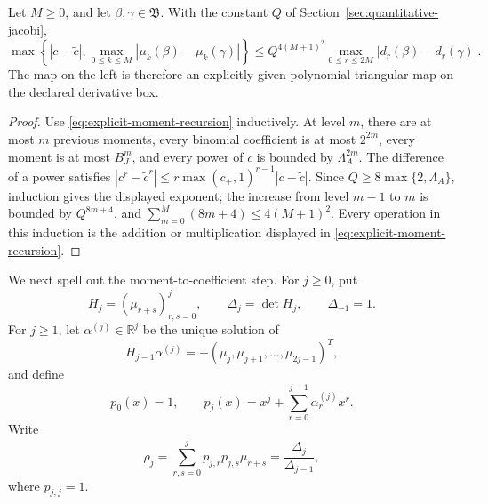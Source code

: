 \begin{proposition}
\label{prop:quantified-moment-map}
Let \(M\ge0\), and let \(\beta,\gamma\in\mathfrak B\).  With the constant
\(Q\) of Section~\ref{sec:quantitative-jacobi},
\begin{equation}
 \max\left\{|c-\widetilde c|,
       \max_{0\le k\le M}|\mu_k(\beta)-\mu_k(\gamma)|\right\}
 \le Q^{4(M+1)^2}
       \max_{0\le r\le2M}|d_r(\beta)-d_r(\gamma)|.
 \label{eq:quantified-moment-map}
\end{equation}
The map on the left is therefore an explicitly given polynomial-triangular
map on the declared derivative box.
\end{proposition}

\begin{proof}
Use \eqref{eq:explicit-moment-recursion} inductively.  At level \(m\), there
are at most \(m\) previous moments, every binomial coefficient is at most
\(2^{2m}\), every moment is at most \(B_J^m\), and every power of \(c\) is
bounded by \(\Lambda_A^{2m}\).  The difference of a power satisfies
\(|c^r-\widetilde c^r|\le r\max(c_+,1)^{r-1}|c-\widetilde c|\).
Since \(Q\ge8\max\{2,\Lambda_A\}\), induction gives the displayed exponent;
the increase from level \(m-1\) to \(m\) is bounded by \(Q^{8m+4}\), and
\(\sum_{m=0}^{M}(8m+4)\le4(M+1)^2\).  Every operation in this induction is
the addition or multiplication displayed in
\eqref{eq:explicit-moment-recursion}.
\end{proof}

We next spell out the moment-to-coefficient step.  For \(j\ge0\), put
\[
 H_j=(\mu_{r+s})_{r,s=0}^{j},\qquad
 \Delta_j=\det H_j,\qquad \Delta_{-1}=1.
\]
For \(j\ge1\), let \(\alpha^{(j)}\in\mathbb R^j\) be the unique solution of
\begin{equation}
 H_{j-1}\alpha^{(j)}
 =-(\mu_j,\mu_{j+1},\ldots,\mu_{2j-1})^T,
 \label{eq:gram-linear-system}
\end{equation}
and define
\[
 p_0(x)=1,\qquad
 p_j(x)=x^j+\sum_{r=0}^{j-1}\alpha_r^{(j)}x^r.
\]
Write
\begin{equation}
 \rho_j=\sum_{r,s=0}^{j}p_{j,r}p_{j,s}\mu_{r+s}
       =\frac{\Delta_j}{\Delta_{j-1}},
 \label{eq:monic-norm-determinant}
\end{equation}
where \(p_{j,j}=1\).

